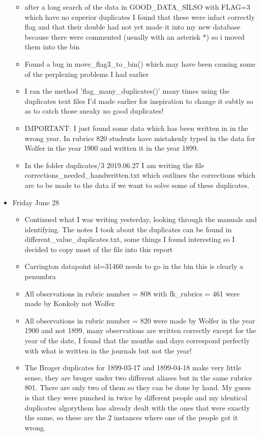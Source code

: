 \documentclass[12pt]{article}
\begin{document}
\begin{itemize}
\begin{itemize}
        \item after a long search of the data in GOOD\_DATA\_SILSO with FLAG=3 which have no superior duplicates I found that these were infact correctly flag and that their double had not yet made it into my new database because there were commented (usually with an asterisk *) so i moved them into the bin
        \item Found a bug in move\_flag3\_to\_bin() which may have been causing some of the perplexing problems I had earlier
        \item I ran the method 'flag\_many\_duplicates()' many times using the duplicates text files I'd made earlier for inspiration to change it subtly so as to catch those sneaky no good duplicates!
        \item IMPORTANT: I just found some data which has been written in in the wrong year. In rubrics 820 students have mistakenly typed in the data for Wolfer in the year 1900 and written it in the year 1899.
        \item In the folder duplicates/3 2019.06.27 I am writing the file corrections\_needed\_handwritten.txt which outlines the corrections which are to be made to the data if we want to solve some of these duplicates.
    \end{itemize}
    \item Friday June 28 
    \begin{itemize}
        \item Continued what I was writing yesterday, looking through the manuals and identifying. The notes I took about the duplicates can be found in different\_value\_duplicates.txt, some things I found interesting so I decided to copy most of the file into this report
        \item Carrington datapoint id=31460 needs to go in the bin this is clearly a penumbra
        \item All observations in rubric number = 808 with fk\_rubrics = 461 were made by Konkoly not Wolfer
        \item All observations in rubric number = 820 were made by Wolfer in the year 1900 and not 1899, many observations are written correctly except for the year of the date, I found that the months and days correspond perfectly with what is written in the journals but not the year!
        \item The Broger duplicates for 1899-03-17 and 1899-04-18 make very little sense, they are broger under two different aliases but in the same rubrics 801. There are only two of them so they can be done by hand. My guess is that they were punched in twice by different people and my identical duplicates algorythem has already dealt with the ones that were exactly the same, so these are the 2 instances where one of the people got it wrong.

\end{itemize}
\end{itemize}
\end{document}
